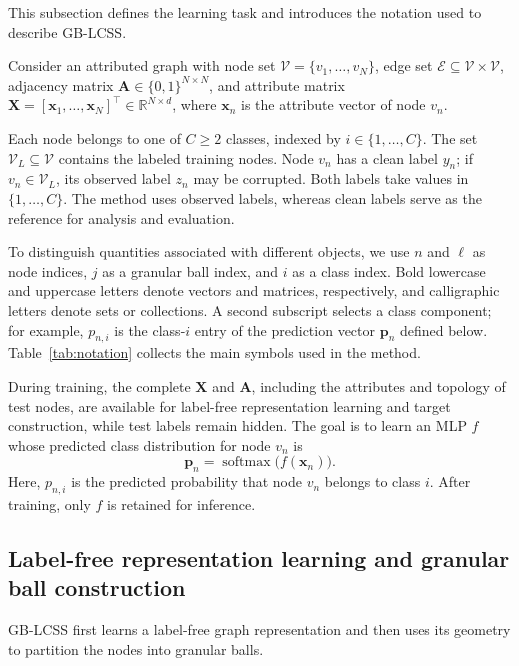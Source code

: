 \documentclass[times,review,10pt]{elsarticle}
\theoremstyle{definition}
\theoremstyle{plain}
\begin{document}
This subsection defines the learning task and introduces the notation used to describe GB-LCSS.

Consider an attributed graph with node set \(\mathcal V=\{v_1,\ldots,v_N\}\), edge set \(\mathcal E\subseteq\mathcal V\times\mathcal V\), adjacency matrix \(\mathbf A\in\{0,1\}^{N\times N}\), and attribute matrix \(\mathbf X=[\mathbf x_1,\ldots,\mathbf x_N]^\top\in\mathbb R^{N\times d}\), where \(\mathbf x_n\) is the attribute vector of node \(v_n\).

Each node belongs to one of \(C\geq2\) classes, indexed by \(i\in\{1,\ldots,C\}\). The set \(\mathcal V_L\subseteq\mathcal V\) contains the labeled training nodes. Node \(v_n\) has a clean label \(y_n\); if \(v_n\in\mathcal V_L\), its observed label \(z_n\) may be corrupted. Both labels take values in \(\{1,\ldots,C\}\). The method uses observed labels, whereas clean labels serve as the reference for analysis and evaluation.

To distinguish quantities associated with different objects, we use \(n\) and \(\ell\) as node indices, \(j\) as a granular ball index, and \(i\) as a class index. Bold lowercase and uppercase letters denote vectors and matrices, respectively, and calligraphic letters denote sets or collections. A second subscript selects a class component; for example, \(p_{n,i}\) is the class-\(i\) entry of the prediction vector \(\mathbf p_n\) defined below. Table~\ref{tab:notation} collects the main symbols used in the method.


During training, the complete \(\mathbf X\) and \(\mathbf A\), including the attributes and topology of test nodes, are available for label-free representation learning and target construction, while test labels remain hidden. The goal is to learn an MLP \(f\) whose predicted class distribution for node \(v_n\) is
\begin{equation}\label{eq:1}
\mathbf p_n=\operatorname{softmax}\bigl(f(\mathbf x_n)\bigr).
\end{equation}
Here, \(p_{n,i}\) is the predicted probability that node \(v_n\) belongs to class \(i\). After training, only \(f\) is retained for inference.

\subsection{Label-free representation learning and granular ball construction}\label{sec:3.2}

GB-LCSS first learns a label-free graph representation and then uses its geometry to partition the nodes into granular balls.
\end{document}
